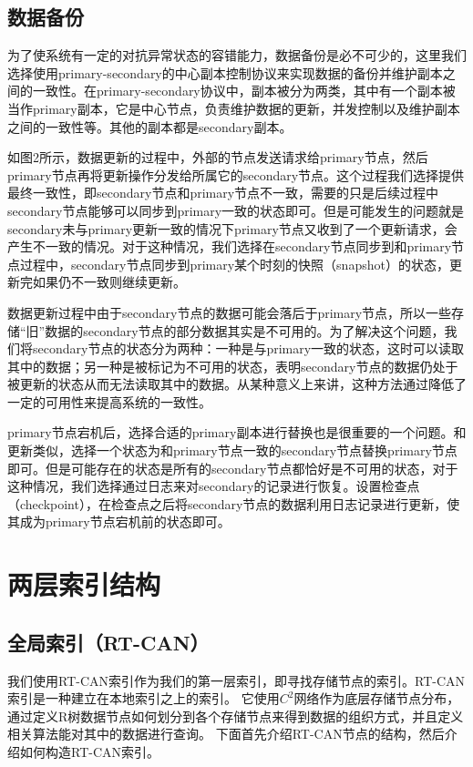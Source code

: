 \documentclass{ML}
\begin{document}
\subsection{数据备份}
为了使系统有一定的对抗异常状态的容错能力，数据备份是必不可少的，这里我们选择使用primary-secondary的中心副本控制协议来实现数据的备份并维护副本之间的一致性。在primary-secondary协议中，副本被分为两类，其中有一个副本被当作primary副本，它是中心节点，负责维护数据的更新，并发控制以及维护副本之间的一致性等。其他的副本都是secondary副本。

如图2所示，数据更新的过程中，外部的节点发送请求给primary节点，然后primary节点再将更新操作分发给所属它的secondary节点。这个过程我们选择提供最终一致性，即secondary节点和primary节点不一致，需要的只是后续过程中secondary节点能够可以同步到primary一致的状态即可。但是可能发生的问题就是secondary未与primary更新一致的情况下primary节点又收到了一个更新请求，会产生不一致的情况。对于这种情况，我们选择在secondary节点同步到和primary节点过程中，secondary节点同步到primary某个时刻的快照（snapshot）的状态，更新完如果仍不一致则继续更新。

数据更新过程中由于secondary节点的数据可能会落后于primary节点，所以一些存储“旧”数据的secondary节点的部分数据其实是不可用的。为了解决这个问题，我们将secondary节点的状态分为两种：一种是与primary一致的状态，这时可以读取其中的数据；另一种是被标记为不可用的状态，表明secondary节点的数据仍处于被更新的状态从而无法读取其中的数据。从某种意义上来讲，这种方法通过降低了一定的可用性来提高系统的一致性。

primary节点宕机后，选择合适的primary副本进行替换也是很重要的一个问题。和更新类似，选择一个状态为和primary节点一致的secondary节点替换primary节点即可。但是可能存在的状态是所有的secondary节点都恰好是不可用的状态，对于这种情况，我们选择通过日志来对secondary的记录进行恢复。设置检查点（checkpoint），在检查点之后将secondary节点的数据利用日志记录进行更新，使其成为primary节点宕机前的状态即可。

\section{两层索引结构}
\subsection{全局索引（RT-CAN）}
我们使用RT-CAN索引作为我们的第一层索引，即寻找存储节点的索引。RT-CAN索引是一种建立在本地索引之上的索引\cite{RT-CAN}。
它使用$C^2$网络作为底层存储节点分布，通过定义R树数据节点如何划分到各个存储节点来得到数据的组织方式，并且定义相关算法能对其中的数据进行查询。
下面首先介绍RT-CAN节点的结构，然后介绍如何构造RT-CAN索引。
\end{document}
